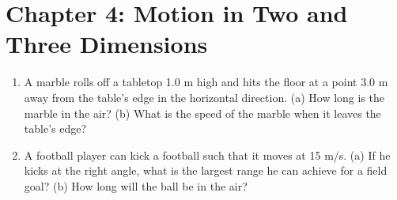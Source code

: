 \documentclass[10pt]{article}
\begin{document}
\section{Chapter 4: Motion in Two and Three Dimensions}

\begin{enumerate}
\item A marble rolls off a tabletop 1.0 m high and hits the floor at a point 3.0 m away from the table’s edge in the horizontal direction. (a) How long is the marble in the air? (b) What is the speed of the marble when it leaves the table’s edge? \\ \vspace{4cm}
\item A football player can kick a football such that it moves at 15 m/s.  (a) If he kicks at the right angle, what is the largest range he can achieve for a field goal? (b) How long will the ball be in the air?
\end{enumerate}
\end{document}
